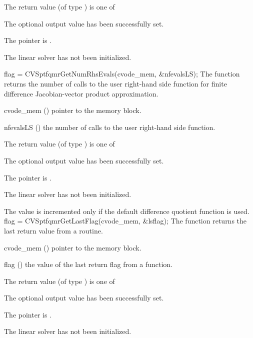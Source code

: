 {
  The return value  (of type ) is one of
  \begin{args}
  \item[\Id{CVSPTFQMR\_SUCCESS}] 
    The optional output value has been successfully set.
  \item[\Id{CVSPTFQMR\_MEM\_NULL}]
    The  pointer is .
  \item[\Id{CVSPTFQMR\_LMEM\_NULL}]
    The {\cvsptfqmr} linear solver has not been initialized.
  \end{args}
}
{}
{
  flag = CVSptfqmrGetNumRhsEvals(cvode\_mem, \&nfevalsLS);
}
{
  The function  returns the
  number of calls to the user right-hand side function for
  finite difference Jacobian-vector product approximation.
}
{
  \begin{args}
  \item[cvode\_mem] ()
    pointer to the {\cvode} memory block.
  \item[nfevalsLS] ()
    the number of calls to the user right-hand side function.
  \end{args}
}
{
  The return value  (of type ) is one of
  \begin{args}
  \item[\Id{CVSPTFQMR\_SUCCESS}] 
    The optional output value has been successfully set.
  \item[\Id{CVSPTFQMR\_MEM\_NULL}]
    The  pointer is .
  \item[\Id{CVSPTFQMR\_LMEM\_NULL}]
    The {\cvsptfqmr} linear solver has not been initialized.
  \end{args}
}
{
  The value  is incremented only if the default 
   difference quotient function is used.
}
{
  flag = CVSptfqmrGetLastFlag(cvode\_mem, \&lsflag);
}
{
  The function  returns the
  last return value from a {\cvsptfqmr} routine. 
}
{
  \begin{args}
  \item[cvode\_mem] ()
    pointer to the {\cvode} memory block.
  \item[flag] ()
    the value of the last return flag from a {\cvsptfqmr} function.
  \end{args}
}
{
  The return value  (of type ) is one of
  \begin{args}
  \item[\Id{CVSPTFQMR\_SUCCESS}] 
    The optional output value has been successfully set.
  \item[\Id{CVSPTFQMR\_MEM\_NULL}]
    The  pointer is .
  \item[\Id{CVSPTFQMR\_LMEM\_NULL}]
    The {\cvsptfqmr} linear solver has not been initialized.
  \end{args}
}
